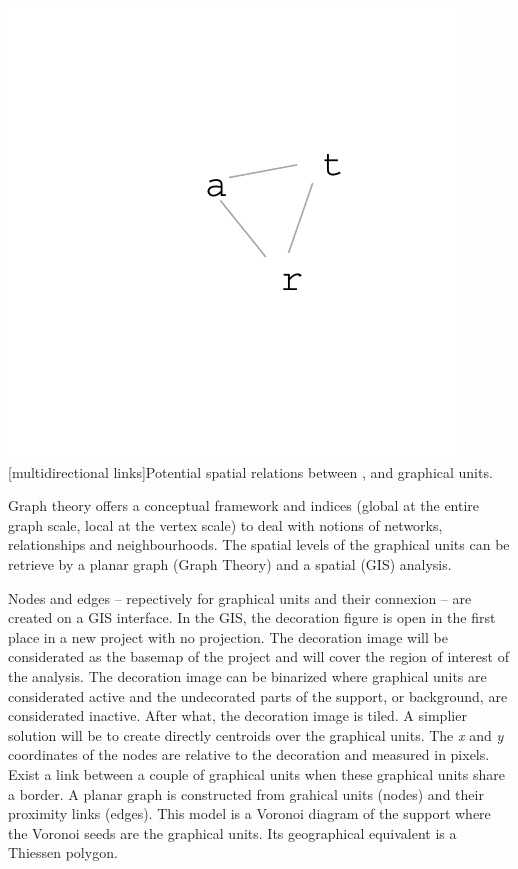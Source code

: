 \documentclass[article]{jss}
\begin{document}
\begin{minipage}{0.8\textwidth}
\centering
\includegraphics{article_rvTH11-art_or_rat}
[multidirectional links]{Potential spatial relations between ,  and  graphical units.}
\end{minipage}

Graph theory offers a conceptual framework and indices (global at the entire graph scale, local at the vertex scale) to deal with notions of networks, relationships and neighbourhoods. The spatial levels of the graphical units can be retrieve by a planar graph (Graph Theory) and a spatial (GIS) analysis.

Nodes and edges -- repectively for graphical units and their connexion -- are created on a GIS interface. In the GIS, the decoration figure is open in the first place in a new project with no projection. The decoration image will be considerated as the basemap of the project and will cover the region of interest of the analysis. The decoration image can be binarized where graphical units are considerated active and the undecorated parts of the support, or background, are considerated inactive. After what, the decoration image is tiled. A simplier solution will be to create directly centroids over the graphical units. The \emph{x} and \emph{y} coordinates of the nodes are relative to the decoration and measured in pixels.
Exist a link between a couple of graphical units when these graphical units share a border. A planar graph is constructed from grahical units (nodes) and their proximity links (edges). This model is a Voronoi diagram of the support where the Voronoi seeds are the graphical units. Its geographical equivalent is a Thiessen polygon.
\end{document}
